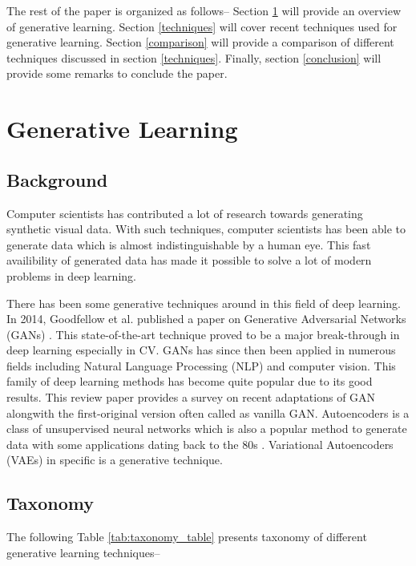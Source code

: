 \documentclass[conference]{IEEEtran}
\begin{document}
The rest of the paper is organized as follows-- Section \ref{lr} will provide an overview of generative learning. Section \ref{techniques} will cover recent techniques used for generative learning. Section \ref{comparison} will provide a comparison of different techniques discussed in section \ref{techniques}. Finally, section \ref{conclusion} will provide some remarks to conclude the paper. 

\section{Generative Learning}
\label{lr}
\subsection{Background}
Computer scientists has contributed a lot of research towards generating synthetic visual data. With such techniques, computer scientists has been able to generate data which is almost indistinguishable by a human eye. This fast availibility of generated data has made it possible to solve a lot of modern problems in deep learning.

There has been some generative techniques around in this field of deep learning. In 2014, Goodfellow et al. published a paper on Generative Adversarial Networks (GANs) \cite{b1}. This state-of-the-art technique proved to be a major break-through in deep learning especially in CV. GANs has since then been applied in numerous fields including Natural Language Processing (NLP) and computer vision. This family of deep learning methods has become quite popular due to its good results. This review paper provides a survey on recent adaptations of GAN alongwith the first-original version often called as vanilla GAN. Autoencoders is a class of unsupervised neural networks which is also a popular method to generate data with some applications dating back to the 80s \cite{b2, b3}. Variational Autoencoders (VAEs) in specific is a generative technique.

\subsection{Taxonomy}
The following Table \ref{tab:taxonomy_table} presents taxonomy of different generative learning techniques--
\end{document}
